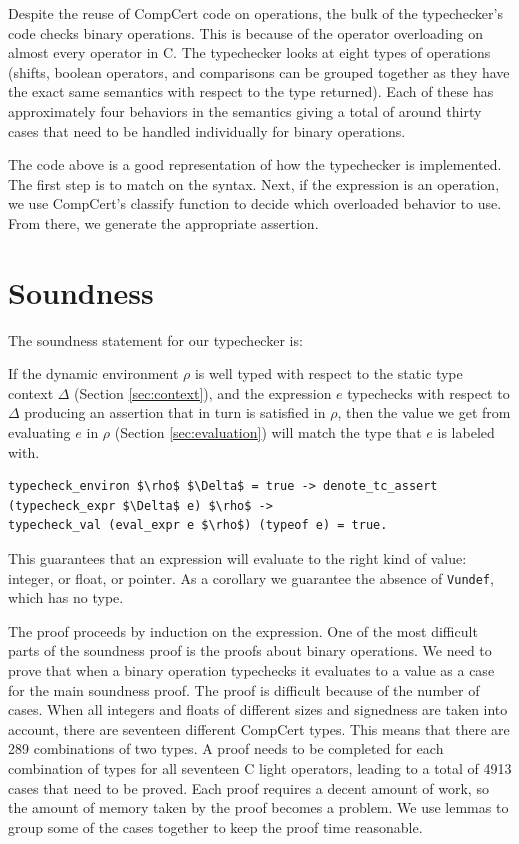 \documentclass{puthesis}
\begin{document}
Despite the reuse of CompCert code on operations, the bulk of the typechecker's
code checks binary operations. This is because of the
operator overloading on almost every operator in C. The typechecker looks
at eight types of operations (shifts, boolean operators, and comparisons can
be grouped together as they have the exact same semantics with respect to
the type returned). Each of these has approximately four behaviors in the
semantics giving a total of around thirty cases that need to be handled individually for binary operations.
 
The code above is a good representation of how the typechecker is
implemented. The first step is to match on the syntax. Next, if the expression
is an operation, we use CompCert's classify function to decide which overloaded
behavior to use. From there, we generate the appropriate assertion. 
 
\section{Soundness}
\label{sec:tc_sound}
The soundness statement for our typechecker is:

If the dynamic environment $\rho$ is well typed with respect to the
static type context $\Delta$ (Section \ref{sec:context}), and the expression
$e$ typechecks with respect to $\Delta$ producing an assertion that in turn is satisfied in $\rho$, 
then the value we get
from evaluating $e$ in $\rho$ (Section \ref{sec:evaluation})
will match the type that $e$ is labeled with. 

\begin{lstlisting}
typecheck_environ $\rho$ $\Delta$ = true -> denote_tc_assert (typecheck_expr $\Delta$ e) $\rho$ ->
typecheck_val (eval_expr e $\rho$) (typeof e) = true.
\end{lstlisting} 

This guarantees that an expression will evaluate to 
the right kind of value: integer, or float, or pointer.
As a corollary we guarantee the absence of \lstinline|Vundef|, which has no
type.

The proof proceeds by induction on the expression.
One of the most difficult parts of the soundness proof is the proofs about
binary operations. We need to prove that when a binary operation typechecks it evaluates to a value as a case for the main soundness
proof. The proof is difficult because of the number of cases. When all
integers and floats of different sizes and signedness are taken into account, there are seventeen different CompCert
types. This means that there are 289 combinations of two types. A proof needs to be
completed for each combination of types for all seventeen C light operators,
leading to a total of 4913 cases that need to be proved.
Each proof requires a decent amount of work, so the amount of memory taken by
the proof becomes a problem. We use lemmas to group some of the cases together
to keep the proof time reasonable. 
\end{document}
